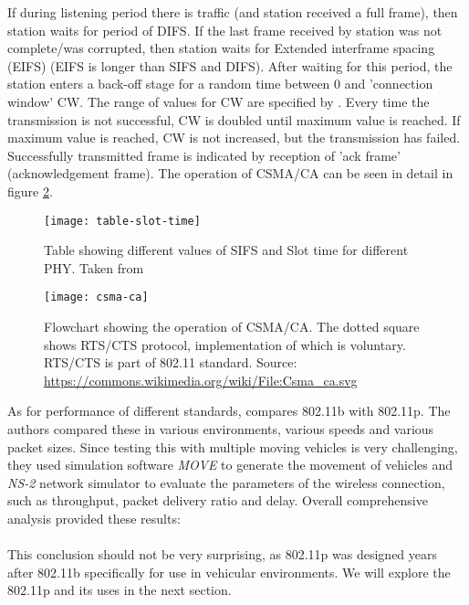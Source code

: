 % 
If during listening period there is traffic (and station received a full frame), then station waits for period of DIFS. If the last frame received by station was not complete/was corrupted, then station waits for Extended interframe spacing (EIFS) (EIFS is longer than SIFS and DIFS). After waiting for this period, the station enters a back-off stage for a random time between 0 and 'connection window' CW. The range of values for CW are specified by \cite{2016IEEEAccess.}. Every time the transmission is not successful, CW is doubled until maximum value is reached. If maximum value is reached, CW is not increased, but the transmission has failed. Successfully transmitted frame is indicated by reception of 'ack frame' (acknowledgement frame). The operation of CSMA/CA can be seen in detail in figure \ref{fig:csma-ca}.\par
% 
% 
\begin{figure}[h]
    \centering
    \texttt{[image: table-slot-time]}
    \caption{Table showing different values of SIFS and Slot time for different PHY. Taken from \cite{Aboul-Magd2008WirelessPerspective}}
    \label{fig:table-st}
\end{figure}
% 
\begin{figure}
    \centering
    \texttt{[image: csma-ca]}
    \caption{Flowchart showing the operation of CSMA/CA. The dotted square shows RTS/CTS protocol, implementation of which is voluntary. RTS/CTS is part of 802.11 standard. Source: \url{https://commons.wikimedia.org/wiki/File:Csma_ca.svg}}
    \label{fig:csma-ca}
\end{figure}
% 
As for performance of different standards, \cite{Bilgin2013PerformanceAreas} compares 802.11b with 802.11p. The authors compared these in various environments, various speeds and various packet sizes. Since testing this with multiple moving vehicles is very challenging, they used simulation software \emph{MOVE} to generate the movement of vehicles and \emph{NS-2} network simulator to evaluate the parameters of the wireless connection, such as throughput, packet delivery ratio and delay. 
Overall comprehensive analysis provided these results:\\ \\
This conclusion should not be very surprising, as 802.11p was designed years after 802.11b specifically for use in vehicular environments. We will explore the 802.11p and its uses in the next section.